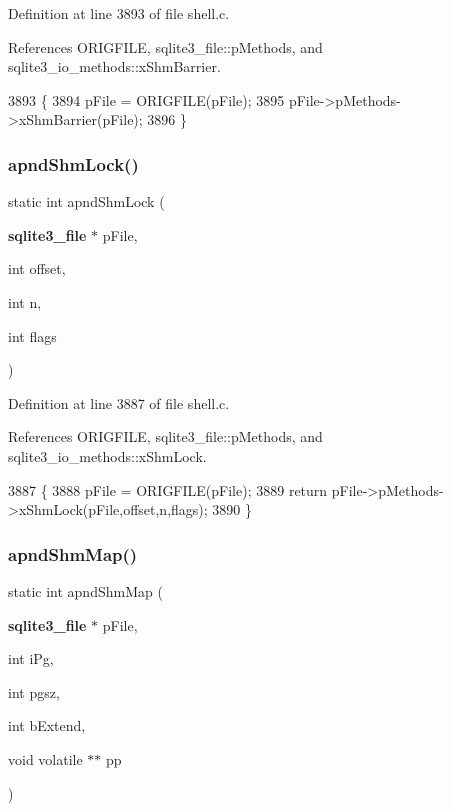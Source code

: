 Definition at line 3893 of file shell.\+c.



References O\+R\+I\+G\+F\+I\+LE, sqlite3\+\_\+file\+::p\+Methods, and sqlite3\+\_\+io\+\_\+methods\+::x\+Shm\+Barrier.


\begin{DoxyCode}
3893                                                \{
3894   pFile = ORIGFILE(pFile);
3895   pFile->pMethods->xShmBarrier(pFile);
3896 \}
\end{DoxyCode}
\mbox{\label{shell_8c_a4d08800d58a64016bdcd385724f691e8}} 
\subsubsection{apnd\+Shm\+Lock()}
{\footnotesize\ttfamily static int apnd\+Shm\+Lock (\begin{DoxyParamCaption}\item[{\textbf{ sqlite3\+\_\+file} $\ast$}]{p\+File,  }\item[{int}]{offset,  }\item[{int}]{n,  }\item[{int}]{flags }\end{DoxyParamCaption})\hspace{0.3cm}{\ttfamily [static]}}



Definition at line 3887 of file shell.\+c.



References O\+R\+I\+G\+F\+I\+LE, sqlite3\+\_\+file\+::p\+Methods, and sqlite3\+\_\+io\+\_\+methods\+::x\+Shm\+Lock.


\begin{DoxyCode}
3887                                                                          \{
3888   pFile = ORIGFILE(pFile);
3889   \textcolor{keywordflow}{return} pFile->pMethods->xShmLock(pFile,offset,n,flags);
3890 \}
\end{DoxyCode}
\mbox{\label{shell_8c_a167ef5896a9a56ee17d171fd3a6258ec}} 
\subsubsection{apnd\+Shm\+Map()}
{\footnotesize\ttfamily static int apnd\+Shm\+Map (\begin{DoxyParamCaption}\item[{\textbf{ sqlite3\+\_\+file} $\ast$}]{p\+File,  }\item[{int}]{i\+Pg,  }\item[{int}]{pgsz,  }\item[{int}]{b\+Extend,  }\item[{void volatile $\ast$$\ast$}]{pp }\end{DoxyParamCaption})\hspace{0.3cm}{\ttfamily [static]}}



